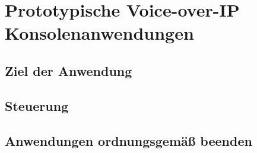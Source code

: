 \chapter{Prototypische Voice-over-IP Konsolenanwendungen}
\label{prototypProgram}
\section{Ziel der Anwendung}
\section{Steuerung}
\section{Anwendungen ordnungsgemäß beenden}
